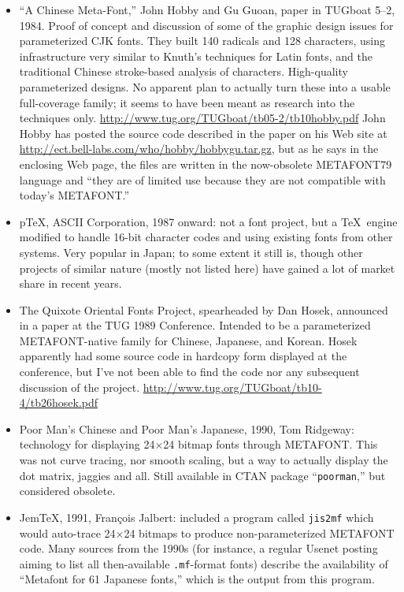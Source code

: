 \documentclass[14pt]{extarticle}
\begin{document}
\begin{itemize}

\item ``A Chinese Meta-Font,'' John Hobby and Gu Guoan, paper in TUGboat
5--2, 1984.  Proof of concept and discussion of some of the graphic design
issues for parameterized CJK fonts.  They built 140 radicals and 128
characters, using infrastructure very similar to Knuth's techniques for
Latin fonts, and the traditional Chinese stroke-based analysis of
characters.  High-quality parameterized designs.  No apparent plan to
actually turn these into a usable full-coverage family; it seems to have
been meant as research into the techniques only. 
\url{http://www.tug.org/TUGboat/tb05-2/tb10hobby.pdf}  John Hobby has posted
the source code described in the paper on his Web site at
\url{http://ect.bell-labs.com/who/hobby/hobbygu.tar.gz}, but as he says in
the enclosing Web page, the files are written in the now-obsolete
METAFONT79 language and ``they are of limited use because they are not
compatible with today's METAFONT.''

\item p\TeX, ASCII Corporation, 1987 onward: not a font project, but a \TeX\
engine modified to handle 16-bit character codes and using existing fonts
from other systems.  Very popular in Japan; to some extent it still is,
though other projects of similar nature (mostly not listed here) have
gained a lot of market share in recent years.

\item The Quixote Oriental Fonts Project, spearheaded by Dan Hosek,
announced in a paper at the TUG 1989 Conference.  Intended to be a
parameterized METAFONT-native family for Chinese, Japanese, and Korean.
Hosek apparently had some source code in hardcopy form displayed at the
conference, but I've not been able to find the code nor any subsequent
discussion of the project.
\url{http://www.tug.org/TUGboat/tb10-4/tb26hosek.pdf}

\item Poor Man's Chinese and Poor Man's Japanese, 1990, Tom Ridgeway:
technology for displaying 24×24 bitmap fonts through METAFONT.  This
was not curve tracing, nor smooth scaling, but a way to actually display
the dot matrix, jaggies and all.  Still available in CTAN package
``\texttt{poorman},'' but considered obsolete.

\item Jem\TeX, 1991, François Jalbert: included a program called
\texttt{jis2mf} which would auto-trace 24×24 bitmaps to produce
non-parameterized METAFONT code.  Many sources from the 1990s
(for instance, a regular Usenet posting
aiming to list all then-available \texttt{.mf}-format fonts) describe
the availability of ``Metafont for 61 Japanese fonts,'' which is the output
from this program.


\end{itemize}
\end{document}

